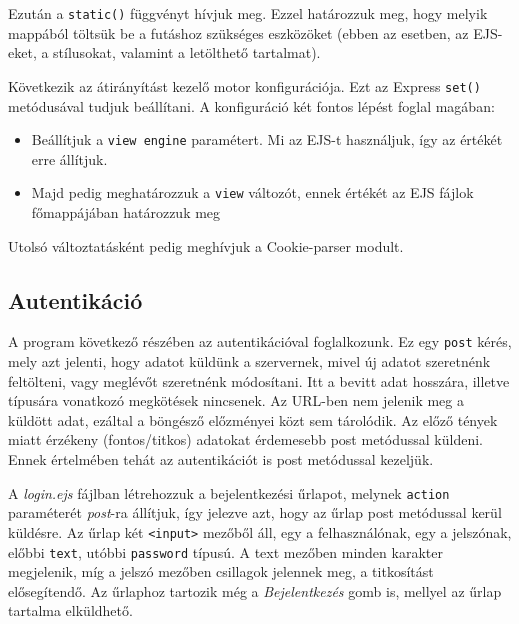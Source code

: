Ezután a \texttt{static()} függvényt hívjuk meg. Ezzel határozzuk meg, hogy melyik mappából töltsük be a futáshoz szükséges eszközöket (ebben az esetben, az EJS-eket, a stílusokat, valamint a letölthető tartalmat).

Következik az átirányítást kezelő motor konfigurációja. Ezt az Express \texttt{set()} metódusával tudjuk beállítani. A konfiguráció két fontos lépést foglal magában:
\begin{itemize}
\item{Beállítjuk a \texttt{view engine} paramétert. Mi az EJS-t használjuk, így az értékét erre állítjuk.}
\item{Majd pedig meghatározzuk a \texttt{view} változót, ennek értékét az EJS fájlok főmappájában határozzuk meg}
\end{itemize}

Utolsó változtatásként pedig meghívjuk a Cookie-parser modult.


\subsection{Autentikáció}

A program következő részében az autentikációval foglalkozunk. Ez egy \texttt{post} kérés, mely azt jelenti, hogy adatot küldünk a szervernek, mivel új adatot szeretnénk feltölteni, vagy meglévőt szeretnénk módosítani. Itt a bevitt adat hosszára, illetve típusára vonatkozó megkötések nincsenek. Az URL-ben nem jelenik meg a küldött adat, ezáltal a böngésző előzményei közt sem tárolódik. Az előző tények miatt érzékeny (fontos/titkos) adatokat érdemesebb post metódussal küldeni. Ennek értelmében tehát az autentikációt is post metódussal kezeljük.

A \textit{login.ejs} fájlban létrehozzuk a bejelentkezési űrlapot, melynek \texttt{action} paraméterét \textit{post}-ra állítjuk, így jelezve azt, hogy az űrlap post metódussal kerül küldésre. Az űrlap két \texttt{<input>} mezőből áll, egy a felhasználónak, egy a jelszónak,  előbbi \texttt{text}, utóbbi \texttt{password} típusú. A text mezőben minden karakter megjelenik, míg a jelszó mezőben csillagok jelennek meg, a titkosítást elősegítendő. Az űrlaphoz tartozik még a \textit{Bejelentkezés} gomb is, mellyel az űrlap tartalma elküldhető.

